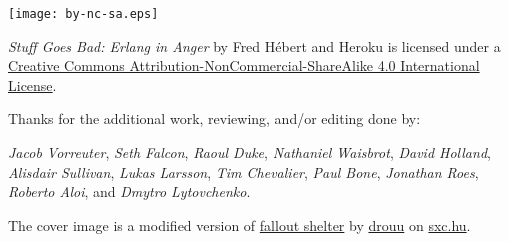 \clearpage
\thispagestyle{fancy}

\fancyhf{} %
\renewcommand{\headrulewidth}{0pt} %
\renewcommand{\footrulewidth}{0pt}

\vspace*{\fill}


\begin{center}
\texttt{[image: by-nc-sa.eps]}
\end{center}

\begin{center}
\emph{Stuff Goes Bad: Erlang in Anger} by Fred Hébert and Heroku is licensed under a \href{http://creativecommons.org/licenses/by-nc-sa/4.0/}{Creative Commons Attribution-NonCommercial-ShareAlike 4.0 International License}.
\end{center}

Thanks for the additional work, reviewing, and/or editing done by:

\emph{Jacob Vorreuter}, \emph{Seth Falcon}, \emph{Raoul Duke}, \emph{Nathaniel Waisbrot}, \emph{David Holland}, \emph{Alisdair Sullivan}, \emph{Lukas Larsson}, \emph{Tim Chevalier}, \emph{Paul Bone}, \emph{Jonathan Roes}, \emph{Roberto Aloi}, and \emph{Dmytro Lytovchenko}.

\null
\vfill
The cover image is a modified version of \href{http://www.freeimages.com/photo/533163}{fallout shelter} by \href{http://www.freeimages.com/profile/drouu}{drouu} on \href{http://sxc.hu}{sxc.hu}.


